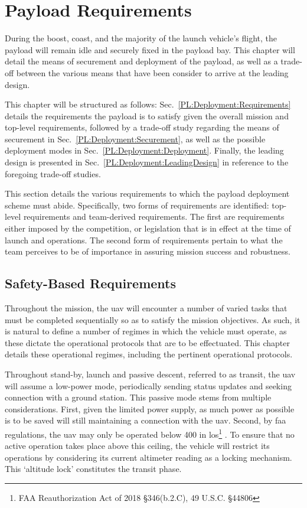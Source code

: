 \chapter{Payload Requirements}

During the boost, coast, and the majority of the launch vehicle's flight, the payload will remain idle and securely fixed in the payload bay. This chapter will detail the means of securement and deployment of the payload, as well as a trade-off between the various means that have been consider to arrive at the leading design.

This chapter will be structured as follows: Sec.~\ref{PL:Deployment:Requirements} details the requirements the payload is to satisfy given the overall mission and top-level requirements, followed by a trade-off study regarding the means of securement in Sec.~\ref{PL:Deployment:Securement}, as well as the possible deployment modes in Sec.~\ref{PL:Deployment:Deployment}. Finally, the leading design is presented in Sec.~\ref{PL:Deployment:LeadingDesign} in reference to the foregoing trade-off studies.

This section details the various requirements to which the payload deployment scheme must abide. Specifically, two forms of requirements are identified: top-level requirements and team-derived requirements. The first are requirements either imposed by the competition, or legislation that is in effect at the time of launch and operations. The second form of requirements pertain to what the team perceives to be of importance in assuring mission success and robustness.
\section{Safety-Based Requirements}
Throughout the mission, the \gls{uav} will encounter a number of varied tasks that must be completed sequentially so as to satisfy the mission objectives. As such, it is natural to define a number of regimes in which the vehicle must operate, as these dictate the operational protocols that are to be effectuated. This chapter details these operational regimes, including the pertinent operational protocols.

Throughout stand-by, launch and passive descent, referred to as transit, the \gls{uav} will assume a low-power mode, periodically sending status updates and seeking connection with a ground station. This passive mode stems from multiple considerations. First, given the limited power supply, as much power as possible is to be saved will still maintaining a connection with the \gls{uav}. Second, by \gls{faa} regulations, the \gls{uav} may only be operated below \SI{400}{\feet} in \gls{los}\footnote{FAA Reauthorization Act of 2018 \S 346(b.2.C), 49 U.S.C. \S 44806} \citep{FederalAviationAdministration2018}. To ensure that no active operation takes place above this ceiling, the vehicle will restrict its operations by considering its current altimeter reading as a locking mechanism. This `altitude lock' constitutes the transit phase.

